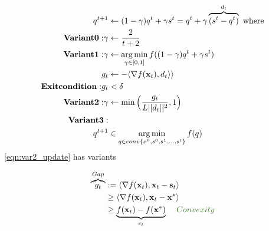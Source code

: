 \documentclass[summaries.tex]{subfiles}
\begin{document}
\begin{align}
  q^{t + 1} &\gets (1 - \gamma) q^t + \gamma s^t = q^t + \gamma\overbrace{(s^t - q^t)}^{d_t} 
  \textrm{ where}\nonumber\\
  \mathbf{Variant 0:} 
  \gamma &\gets \frac{2}{t + 2} \\
  \mathbf{Variant 1:}
  \gamma &\gets \operatorname*{arg\,min}\limits_{\gamma \in [0, 1]} f((1 - \gamma) q^t + \gamma s^t)
  \label{eqn:update_lsearch} \\
  g_t &\gets -\langle \nabla f(\mathbf{x}_t), d_t \rangle \rangle \nonumber\\
  \mathbf{Exit condition:} g_t &< \delta \nonumber\\
  \mathbf{Variant 2:} \gamma &\gets \min \Big(\frac{g_t}{L ||d_t|| ^2}, 1\Big)
  \label{eqn:var2_update} \\
  \mathbf{Variant 3:} \nonumber\\
  q^{t + 1} &\in \operatorname*{arg\,min}\limits_{q \in conv\{x^0, s^0, s^1, \hdots, s^t\}}f(q)
  \label{eqn:var3_fc} \\
\end{align}
\ref{eqn:var2_update} has variants \cite{pedregosa2018frank} \cite{Demyanov70} 

 \INPROGRESS
\begin{align}
  \overbrace{g_t}^{Gap} &:= \langle \grad f(\bx_t), \bx_t - \bs_t \rangle \nonumber\\
                        &\geq  \langle \grad f(\bx_t), \bx_t - \bx^{*} \rangle \nonumber\\
                        &\geq \underbrace{f(\bx_t) - f(\bx^{*})}_{\epsilon_t} \hspace{4mm} \comm{Convexity} \\
\end{align}
\end{document}
